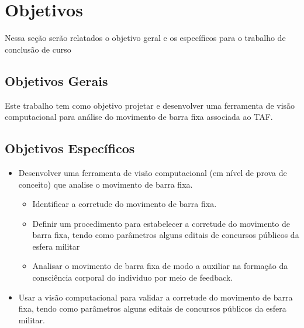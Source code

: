 \section{Objetivos}
Nessa seção serão relatados o objetivo geral e os específicos para o trabalho de
conclusão de curso

\subsection{Objetivos Gerais}	
 Este trabalho tem como objetivo projetar e desenvolver uma  ferramenta de visão computacional para análise do movimento de barra fixa associada ao \ac{TAF}.
 
\subsection{Objetivos Específicos}	
\begin{itemize}

    \item Desenvolver uma ferramenta de visão computacional (em nível de prova de conceito) que analise o movimento de barra fixa.
    
    \begin{itemize}
        \item Identificar a corretude do movimento de barra fixa.
        \item Definir um procedimento para estabelecer a corretude do movimento de barra fixa, tendo como parâmetros alguns editais de concursos públicos da esfera militar
        \item Analisar o movimento de barra fixa de modo a auxiliar na formação da consciência corporal do individuo por meio de feedback.
    \end{itemize}

    \item Usar a visão computacional para validar a corretude do movimento de barra fixa, tendo como parâmetros alguns editais de concursos públicos da esfera militar.
    
\end{itemize}
